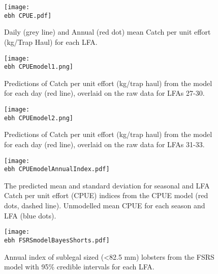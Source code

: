 \documentclass[11pt]{article}
\newcommand{\ebh}{/backup/bio_data/bio.lobster/figures/LFA2733Framework2018/} %
\begin{document}
    \begin{figure}
    \centering
        \texttt{[image: \\ebh CPUE.pdf]}
        \caption{Daily (grey line) and Annual (red dot) mean Catch per unit effort (kg/Trap Haul) for each LFA.}

    \end{figure}




    \begin{figure}
    \centering
        \texttt{[image: \\ebh CPUEmodel1.png]}
        \caption{Predictions of Catch per unit effort (kg/trap haul) from the model for each day (red line), overlaid on the raw data for LFAs 27-30. }

    \end{figure}


    \begin{figure}
    \centering
        \texttt{[image: \\ebh CPUEmodel2.png]}
        \caption{Predictions of Catch per unit effort (kg/trap haul) from the model for each day (red line), overlaid on the raw data for LFAs 31-33.}

    \end{figure}

    \begin{figure}
    \centering
        \texttt{[image: \\ebh CPUEmodelAnnualIndex.pdf]}
        \caption{The predicted mean and standard deviation for seasonal and LFA Catch per unit effort (CPUE) indices from the CPUE model (red dots, dashed line). Unmodelled mean CPUE for each season and LFA (blue dots).}

    \end{figure}




    \begin{figure}
    \centering
        \texttt{[image: \\ebh FSRSmodelBayesShorts.pdf]}
        \caption{Annual index of sublegal sized (\textless 82.5 mm) lobsters from the FSRS model with 95\% credible intervals for each LFA.}

    \end{figure}
\end{document}
